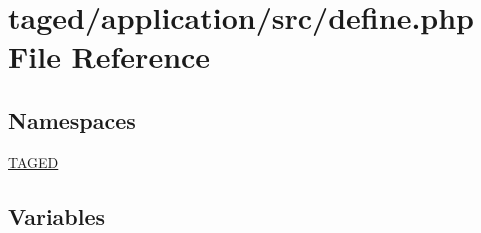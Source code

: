\hypertarget{application_2src_2define_8php}{}\section{taged/application/src/define.php File Reference}
\label{application_2src_2define_8php}
\subsection*{Namespaces}
\begin{DoxyCompactItemize}
\item 
 \hyperlink{namespace_t_a_g_e_d}{T\+A\+G\+ED}
\end{DoxyCompactItemize}
\subsection*{Variables}
